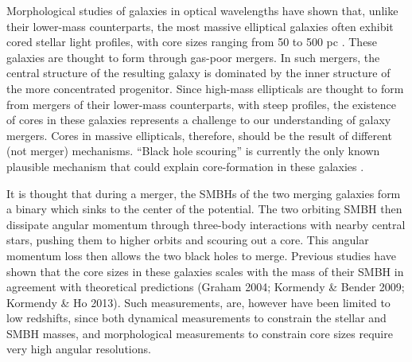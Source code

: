\documentclass[chicago]{emulateapj}
\begin{document}
Morphological studies of galaxies in optical wavelengths have shown that, unlike their lower-mass counterparts, the most massive elliptical galaxies often exhibit cored stellar light profiles, with core sizes ranging from 50 to 500 pc \citep{e.g.ferrarese06}. 
These galaxies are thought to form through gas-poor mergers. In such mergers, the central structure of the resulting galaxy is dominated by the inner structure of the more concentrated progenitor.  Since high-mass ellipticals are thought to form from mergers of their lower-mass counterparts, with steep profiles, the existence of cores in these galaxies represents a challenge to our understanding of galaxy mergers. Cores in massive ellipticals, therefore, should be the result of different (not merger) mechanisms.  
``Black hole scouring'' is currently the only known plausible mechanism that could explain core-formation in these galaxies \citep{Thomas:14}.

It is thought that during a merger, the SMBHs of the two merging galaxies form a binary which sinks to the center of the potential. The two orbiting SMBH then dissipate angular momentum through three-body interactions with nearby central stars, pushing them to higher orbits and scouring out a core. This angular momentum loss then allows the two black holes to merge. \citep{Begelman et al. 1980}
Previous studies have shown that the core sizes in these galaxies scales with the mass of their SMBH in agreement with theoretical predictions (Graham 2004; Kormendy \& Bender 2009; Kormendy \& Ho 2013).
Such measurements, are, however have been limited to low redshifts, since both dynamical measurements to constrain the stellar and SMBH masses, and morphological measurements to constrain core sizes require very high angular resolutions. 
\end{document}
